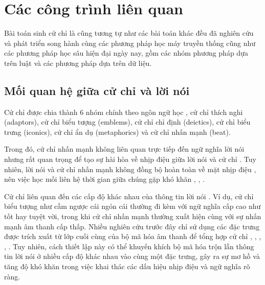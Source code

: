 \chapter{Các công trình liên quan}
\label{Chapter2}

Bài toán sinh cử chỉ là cũng tương tự như các bài toán khác đều đã nghiên cứu và phát triển song hành cùng các phương pháp học máy truyền thống cũng như các phương pháp học sâu hiện đại ngày nay, gồm các nhóm phương pháp dựa trên luật và các phương pháp dựa trên dữ liệu. 

\section{Mối quan hệ giữa cử chỉ và lời nói}

Cử chỉ được chia thành 6 nhóm chính theo ngôn ngữ  học \cite{ekman1969repertoire}, \cite{sebeok2011advances} cử chỉ thích nghi (adaptors), cử chỉ biểu tượng (emblems), cử chỉ chỉ định (deictics), cử chỉ biểu trưng (iconics), cử chỉ ẩn dụ (metaphorics) và cử chỉ nhấn mạnh (beat).

 Trong đó, cử chỉ nhấn mạnh không liên quan trực tiếp đến ngữ nghĩa lời nói \cite{kipp2005gesture} nhưng rất quan trọng để tạo sự hài hòa về nhịp điệu giữa lời nói và cử chỉ  \cite{sebeok2011advances} . Tuy nhiên, lời nói và cử chỉ nhấn mạnh không đồng bộ hoàn toàn về mặt nhịp điệu \cite{mcclave1994gestural}, nên việc học mối liên hệ thời gian giữa chúng gặp khó khăn \cite{bhattacharya2021speech2affectivegestures}, \cite{kucherenko2020gesticulator}, \cite{yoon2020speech}.

Cử chỉ liên quan đến các cấp độ khác nhau của thông tin lời nói \cite{sebeok2011advances}. Ví dụ, cử chỉ biểu tượng như cầm ngược cái ngón cái thường đi kèm với ngữ nghĩa cấp cao như tốt hay tuyệt vời, trong khi cử chỉ nhấn mạnh thường xuất hiện cùng với sự nhấn mạnh âm thanh cấp thấp. Nhiều nghiên cứu trước đây chỉ sử dụng các đặc trưng được trích xuất từ lớp cuối cùng của bộ mã hóa âm thanh để tổng hợp cử chỉ \cite{alexanderson2020style},  \cite{bhattacharya2021speech2affectivegestures}, \cite{kucherenko2021large}, \cite{qian2021speech},  \cite{yoon2022genea}. Tuy nhiên, cách thiết lập này có thể khuyến khích bộ mã hóa trộn lẫn thông tin lời nói ở nhiều cấp độ khác nhau vào cùng một đặc trưng, gây ra sự mơ hồ và tăng độ khó khăn trong việc khai thác các dấu hiệu nhịp điệu và ngữ nghĩa rõ ràng.

